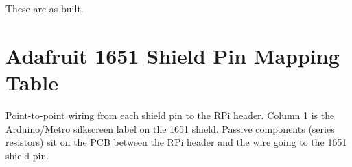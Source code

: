 \documentclass[11pt,a4paper]{article}
\begin{document}
\begin{warnbox}
	These are as-built.
\end{warnbox}

\section{Adafruit 1651 Shield Pin Mapping Table}
\label{sec:1651}

Point-to-point wiring from each shield pin to the RPi header.
Column 1 is the Arduino/Metro silkscreen label on the 1651 shield.
Passive components (series resistors) sit on the PCB between the RPi
header and the wire going to the 1651 shield pin.

\vspace{6pt}
\renewcommand{\arraystretch}{1.30}
\end{document}
